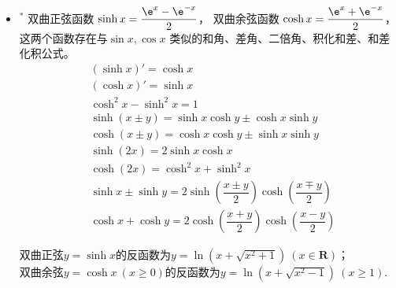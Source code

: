 \begin{itemize}[leftmargin=\inteval{\myitemleftmargin}pt,itemsep=
   \inteval{\myitemitempsep}pt,topsep=\inteval{\myitemtopsep}pt]
因为两个角的正、余弦的和(差)角公式，$ \sin $的数量等于$ \cos $
的数量，多个角的和与差展开，就是反复运用两个角的和与差展开，
所以$ \sin $的数量会始终等于等于$ \cos $的数量。
手工计算时可以利用这一性质进行快速检查，若发现数量不相等，
则肯定存在错误。

\item $^*$ 双曲正弦函数 $ \sinh x=\dfrac{\e^x-\e^{-x}}{2} $， 双曲余弦函数
$\cosh x=\dfrac{\e^x+\e^{-x}}{2} $，这两个函数存在与$ \sin x,\cos x $
类似的和角、差角、二倍角、积化和差、和差化积公式。
\begin{align*}
& (\sinh x)'=\cosh x\\
& (\cosh x)'=\sinh x \\
& \cosh^2 x-\sinh^2 x=1 \\
& \sinh(x\pm y)=\sinh x\cosh y\pm \cosh x\sinh y \\
& \cosh(x\pm y)=\cosh x\cosh y\pm \sinh x\sinh y \\
& \sinh(2x)=2\sinh x\cosh x \\
& \cosh(2x)=\cosh^2 x+\sinh^2 x \\
& \sinh x\pm \sinh y=2\sinh\left(\dfrac{x\pm y}{2}\right)
\cosh\left(\dfrac{x\mp y}{2}\right) \\
& \cosh x+\cosh y   =2\cosh\left(\dfrac{x+y}{2}\right)
\cosh\left(\dfrac{x-y}{2}\right) 
\end{align*}

双曲正弦$ y=\sinh x $的反函数为$ y=\ln(x+\sqrt{x^2+1})\ (x\in\textbf{R}) $；\\
双曲余弦$ y=\cosh x\ (x\geq 0) $的反函数为$ y=\ln(x+\sqrt{x^2-1})\ (x\geq 1) $.

\end{itemize}

